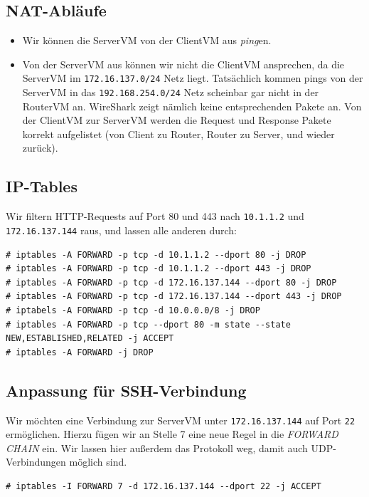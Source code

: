 \documentclass[10pt,a4paper]{article}
\begin{document}
\subsection{NAT-Abläufe} %
\begin{itemize}
    \item Wir können die ServerVM von der ClientVM aus \textit{ping}en.
    \item Von der ServerVM aus können wir nicht die ClientVM ansprechen, da die ServerVM im \texttt{172.16.137.0/24} Netz liegt.
        Tatsächlich kommen pings von der ServerVM in das \texttt{192.168.254.0/24} Netz scheinbar gar nicht in der RouterVM an.
        WireShark zeigt nämlich keine entsprechenden Pakete an. Von der ClientVM zur ServerVM werden die Request und Response
        Pakete korrekt aufgelistet (von Client zu Router, Router zu Server, und wieder zurück).
\end{itemize}

\subsection{IP-Tables} %

Wir filtern HTTP-Requests auf Port 80 und 443 nach \texttt{10.1.1.2} und \texttt{172.16.137.144} raus, und lassen alle anderen durch:
\begin{verbatim}
# iptables -A FORWARD -p tcp -d 10.1.1.2 --dport 80 -j DROP
# iptables -A FORWARD -p tcp -d 10.1.1.2 --dport 443 -j DROP
# iptables -A FORWARD -p tcp -d 172.16.137.144 --dport 80 -j DROP
# iptables -A FORWARD -p tcp -d 172.16.137.144 --dport 443 -j DROP
# iptabels -A FORWARD -p tcp -d 10.0.0.0/8 -j DROP
# iptables -A FORWARD -p tcp --dport 80 -m state --state NEW,ESTABLISHED,RELATED -j ACCEPT
# iptables -A FORWARD -j DROP
\end{verbatim}

\subsection{Anpassung für SSH-Verbindung} %

Wir möchten eine Verbindung zur ServerVM unter \texttt{172.16.137.144} auf Port \texttt{22} ermöglichen. Hierzu fügen wir an Stelle 7 eine neue Regel in die \textit{FORWARD CHAIN} ein. Wir lassen hier außerdem das Protokoll weg, damit auch UDP-Verbindungen möglich sind.
\begin{verbatim}
# iptables -I FORWARD 7 -d 172.16.137.144 --dport 22 -j ACCEPT
\end{verbatim}
\end{document}
